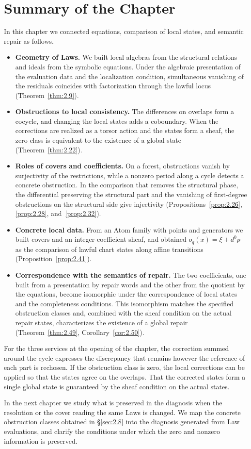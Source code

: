 \section*{Summary of the Chapter}

In this chapter we connected equations, comparison of local states, and semantic repair
as follows.

\begin{itemize}
\item \textbf{Geometry of Laws.} We built local algebras from the structural relations
and ideals from the symbolic equations. Under the algebraic presentation of the
evaluation data and the localization condition, simultaneous vanishing of the residuals
coincides with factorization through the lawful locus (Theorem~\ref{thm:2.9}).
\item \textbf{Obstructions to local consistency.} The differences on overlaps form a
cocycle, and changing the local states adds a coboundary. When the corrections are
realized as a torsor action and the states form a sheaf, the zero class is equivalent to
the existence of a global state (Theorem~\ref{thm:2.22}).
\item \textbf{Roles of covers and coefficients.} On a forest, obstructions vanish by
surjectivity of the restrictions, while a nonzero period along a cycle detects a
concrete obstruction. In the comparison that removes the structural phase, the
differential preserving the structural part and the vanishing of first-degree
obstructions on the structural side give injectivity
(Propositions~\ref{prop:2.26}, \ref{prop:2.28}, and~\ref{prop:2.32}).
\item \textbf{Concrete local data.} From an Atom family with points and generators we
built covers and an integer-coefficient sheaf, and obtained $o_q(x)=\xi+d^0p$ as the
comparison of lawful chart states along affine transitions
(Proposition~\ref{prop:2.41}).
\item \textbf{Correspondence with the semantics of repair.} The two coefficients, one
built from a presentation by repair words and the other from the quotient by the
equations, become isomorphic under the correspondence of local states and the
completeness conditions. This isomorphism matches the specified obstruction classes and,
combined with the sheaf condition on the actual repair states, characterizes the
existence of a global repair (Theorem~\ref{thm:2.49}, Corollary~\ref{cor:2.50}).
\end{itemize}

For the three services at the opening of the chapter, the correction summed around the
cycle expresses the discrepancy that remains however the reference of each part is
rechosen. If the obstruction class is zero, the local corrections can be applied so that
the states agree on the overlaps. That the corrected states form a single global state
is guaranteed by the sheaf condition on the actual states.

In the next chapter we study what is preserved in the diagnosis when the resolution or
the cover reading the same Laws is changed. We map the concrete obstruction classes
obtained in \S\ref{sec:2.8} into the diagnosis generated from Law evaluations, and
clarify the conditions under which the zero and nonzero information is preserved.
